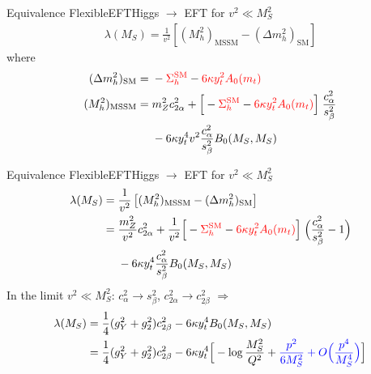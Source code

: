 \documentclass[hyperref={pdfpagelabels=false},ngerman]{beamer}
\newcommand{\MS}{\ensuremath{M_S}}
\newcommand{\SM}{\ensuremath{\text{SM}}}
\newcommand{\MSSM}{\ensuremath{\text{MSSM}}}
\begin{document}

\begin{frame}{Equivalence FlexibleEFTHiggs $\rightarrow$ EFT for $v^2 \ll M_S^2$}
  \begin{align*}
    \lambda(\MS) = \frac{1}{v^2}\left[(M_h^2)_{\MSSM} - (\Delta m_h^2)_{\SM}\right]
  \end{align*}
  where
  \begin{align*}
    (\Delta m_h^2)_{\SM} ={}& - {\color{red}\Sigma^{\SM}_h} - {\color{red}6\kappa y_t^2 A_0(m_t)}\\
    (M_h^2)_{\MSSM} ={}& m_Z^2 c^2_{2\alpha} + \Big[ - {\color{red}\Sigma_h^\SM}
      - {\color{red} 6 \kappa y_t^2 A_0(m_t)} \Big] \; \frac{c^2_\alpha}{s^2_\beta} \\
    &- 6 \kappa y_t^4 v^2 \frac{c^2_\alpha}{s^2_\beta} B_0(\MS,\MS)
  \end{align*}
\end{frame}

\begin{frame}{Equivalence FlexibleEFTHiggs $\rightarrow$ EFT for $v^2 \ll M_S^2$}
  \begin{align*}
    \lambda(\MS) ={}& \frac{1}{v^2}\left[(M_h^2)_{\MSSM} - (\Delta m_h^2)_{\SM}\right] \\
    ={}& \frac{m_Z^2}{v^2} c^2_{2\alpha}
    + \frac{1}{v^2} \Big[ - {\color{red}\Sigma_h^\SM}
    - {\color{red} 6 \kappa y_t^2 A_0(m_t)} \Big] \; \Big(\frac{c^2_\alpha}{s^2_\beta} - 1 \Big) \\
    &- 6 \kappa y_t^4 \frac{c^2_\alpha}{s^2_\beta} B_0(\MS,\MS)
  \end{align*}
  In the limit $v^2 \ll M_S^2$: $c_\alpha^2 \to s_\beta^2$, $c_{2\alpha}^2 \rightarrow c_{2\beta}^2$
  $\Rightarrow$
  \begin{align*}
    \lambda(\MS) ={}& \frac{1}{4} (g_Y^2 + g_2^2) c_{2\beta}^2
    - 6 \kappa y_t^4 B_0(\MS,\MS) \\
    ={}& \frac{1}{4} (g_Y^2 + g_2^2) c_{2\beta}^2
    - 6 \kappa y_t^4 \Big[
    - \log\frac{\MS^2}{Q^2} + \textcolor{blue}{\frac{p^2}{6 \MS^2} + O\Big(\frac{p^4}{\MS^4}\Big)} \Big]
  \end{align*}
\end{frame}

\end{document}
